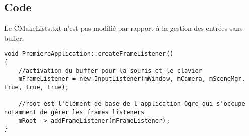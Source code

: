 \subsection{Code}

Le CMakeLists.txt n'est pas modifi\'e par rapport \`a la gestion des entr\'ees sans buffer.


\begin{lstlisting}[caption={PremiereApplication::createFrameListener()}]
void PremiereApplication::createFrameListener()
{
    //activation du buffer pour la souris et le clavier
    mFrameListener = new InputListener(mWindow, mCamera, mSceneMgr, true, true, true);
    
    //root est l'élément de base de l'application Ogre qui s'occupe notamment de gérer les frames listeners
    mRoot -> addFrameListener(mFrameListener);
}

\end{lstlisting}














